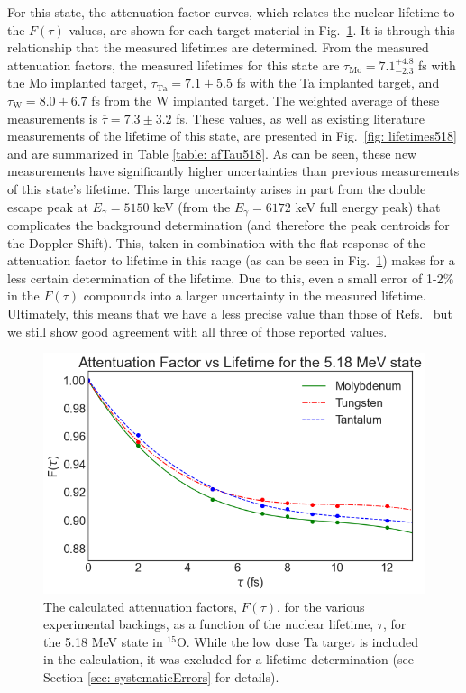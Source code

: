 For this state, the attenuation factor curves, which relates the nuclear lifetime to the $F(\tau)$ values, are shown for each target material in Fig.\ \ref{fig: attFacs518}. It is through this relationship that the measured lifetimes are determined. From the measured attenuation factors, the measured lifetimes for this state are $\tau_{\text{Mo}} = 7.1^{+4.8}_{-2.3}$ fs with the Mo implanted target, $\tau_{\text{Ta}} = 7.1 \pm 5.5$ fs with the Ta implanted target, and $\tau_{\text{W}} = 8.0 \pm 6.7$ fs from the W implanted target. The weighted average of these measurements is $\overline{\tau} = 7.3 \pm 3.2$ fs. These values, as well as existing literature measurements of the lifetime of this state, are presented in Fig.\ \ref{fig: lifetimes518} and are summarized in Table \ref{table: afTau518}. As can be seen, these new measurements have significantly higher uncertainties than previous measurements of this state's lifetime. This large uncertainty arises in part from the double escape peak at $E_{\gamma} = 5150$ keV (from the $E_{\gamma} = 6172$ keV full energy peak) that complicates the background determination (and therefore the peak centroids for the Doppler Shift). This, taken in combination with the flat response of the attenuation factor to lifetime in this range (as can be seen in Fig.\ \ref{fig: attFacs518}) makes for a less certain determination of the lifetime. Due to this, even a small error of 1-2\% in the $F(\tau)$ compounds into a larger uncertainty in the measured lifetime. Ultimately, this means that we have a less precise value than those of Refs.\ \cite{Bertone2001, Schurmann2008, Gill1968} but we still show good agreement with all three of those reported values.


\begin{figure}
\centering
\includegraphics[width=\linewidth]{figures/attFac518.png}
\caption{The calculated attenuation factors, $F(\tau)$, for the various experimental backings, as a function of the nuclear lifetime, $\tau$, for the 5.18 MeV state in $^{15}$O. While the low dose Ta target is included in the calculation, it was excluded for a lifetime determination (see Section \ref{sec: systematicErrors} for details). }
\label{fig: attFacs518}
\end{figure}



